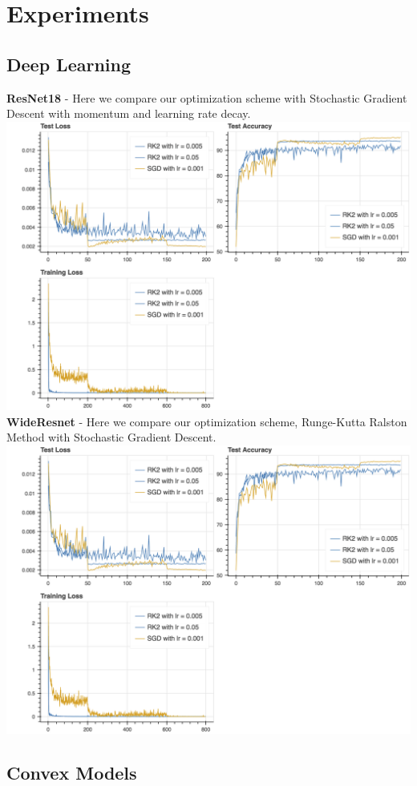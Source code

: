 \section{Experiments}
\subsection{Deep Learning}

\textbf{ResNet18} -
Here we compare our optimization scheme with Stochastic Gradient Descent with momentum and learning rate decay.
\\
\includegraphics[scale=0.5]{cifar.png}
\textbf{WideResnet} -
Here we compare our optimization scheme, Runge-Kutta Ralston Method with Stochastic Gradient Descent.
\\
\includegraphics[scale=0.5]{wideresnet.png}

\subsection{Convex Models}
